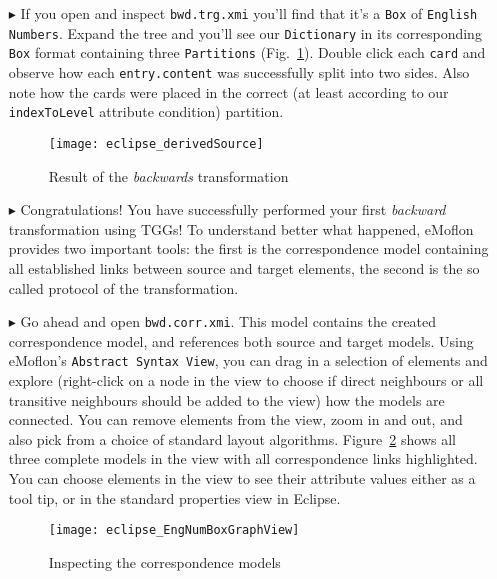 \begin{itemize}
\item[$\blacktriangleright$] If you open and inspect \texttt{bwd.trg.xmi} you'll find that it's a \texttt{Box} of \texttt{English Numbers}.
Expand the tree and you'll see our \texttt{Dictionary} in its corresponding
\texttt{Box} format containing three \texttt{Par\-ti\-tions} (Fig.~\ref{eclipse:derivedBOX}). 
Double click each \texttt{card} and observe how each \texttt{entry.content} was successfully split into two sides.
Also note how the cards were placed in the correct (at least according to our \texttt{indexToLevel} attribute condition) partition.

\begin{figure}[htbp]
\begin{center}
  \texttt{[image: eclipse\_derivedSource]}
  \caption{Result of the \emph{backwards} transformation}
  \label{eclipse:derivedBOX}
\end{center}
\end{figure}

\item[$\blacktriangleright$] Congratulations! You have successfully performed your first \emph{backward} transformation using TGGs!
To understand better what happened, eMoflon provides two important tools: the first is the correspondence model containing all established links between source and target elements, the second is the so called protocol of the transformation. 

\item[$\blacktriangleright$] Go ahead and open \texttt{bwd.corr.xmi}.
This model contains the created correspondence model, and references both source and target models.
Using eMoflon's \texttt{Abstract Syntax View}, you can drag in a selection of elements and explore (right-click on a node in the view to choose if direct neighbours or all transitive neighbours should be added to the view) how the models are connected.
You can remove elements from the view, zoom in and out, and also pick from a choice of standard layout algorithms.
Figure~\ref{eclipse:graphView} shows all three complete models in the view with all correspondence links highlighted. 
You can choose elements in the view to see their attribute values either as a tool tip, or in the standard properties view in Eclipse.

\begin{figure}[htb]
\begin{center}
  \texttt{[image: eclipse\_EngNumBoxGraphView]}
  \caption{Inspecting the correspondence models}
  \label{eclipse:graphView}
\end{center}
\end{figure}


\end{itemize}
